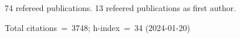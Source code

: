 74 refereed publications. 13 refeered publications as first author.

Total citations~=~3748; h-index~=~34 (2024-01-20)